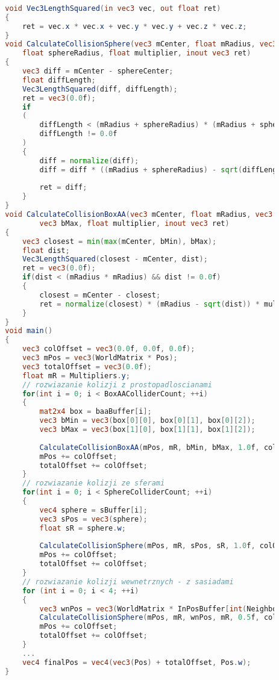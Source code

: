 		\begin{lstlisting}[language=GLSL]
		
		void Vec3LengthSquared(in vec3 vec, out float ret)
		{
			ret = vec.x * vec.x + vec.y * vec.y + vec.z * vec.z;
		}
		void CalculateCollisionSphere(vec3 mCenter, float mRadius, vec3 sphereCenter, 
			float sphereRadius, float multiplier, inout vec3 ret)
		{
			vec3 diff = mCenter - sphereCenter;
			float diffLength;
			Vec3LengthSquared(diff, diffLength);
			ret = vec3(0.0f);
			if
			(
				diffLength < (mRadius + sphereRadius) * (mRadius + sphereRadius) &&
				diffLength != 0.0f
			)
			{
				diff = normalize(diff);
				diff = diff * ((mRadius + sphereRadius) - sqrt(diffLength)) * multiplier;
				
				ret = diff;
			}
		}
		void CalculateCollisionBoxAA(vec3 mCenter, float mRadius, vec3 bMin, 
				vec3 bMax, float multiplier, inout vec3 ret)
		{
			vec3 closest = min(max(mCenter, bMin), bMax);
			float dist;
			Vec3LengthSquared(closest - mCenter, dist);
			ret = vec3(0.0f);
			if(dist < (mRadius * mRadius) && dist != 0.0f)
			{
				closest = mCenter - closest;
				ret = normalize(closest) * (mRadius - sqrt(dist)) * multiplier;
			}
		}
		void main()
		{
			vec3 colOffset = vec3(0.0f, 0.0f, 0.0f);
			vec3 mPos = vec3(WorldMatrix * Pos);
			vec3 totalOffset = vec3(0.0f);
			float mR = Multipliers.y;
			// rozwiazanie kolizji z prostopadloscianami
			for(int i = 0; i < BoxAAColliderCount; ++i)
			{
				mat2x4 box = baaBuffer[i];
				vec3 bMin = vec3(box[0][0], box[0][1], box[0][2]);
				vec3 bMax = vec3(box[1][0], box[1][1], box[1][2]);
				
				CalculateCollisionBoxAA(mPos, mR, bMin, bMax, 1.0f, colOffset);
				mPos += colOffset;
				totalOffset += colOffset;
			}
			// rozwiazanie kolizji ze sferami
			for(int i = 0; i < SphereColliderCount; ++i)
			{
				vec4 sphere = sBuffer[i];
				vec3 sPos = vec3(sphere);
				float sR = sphere.w;
				
				CalculateCollisionSphere(mPos, mR, sPos, sR, 1.0f, colOffset);
				mPos += colOffset;
				totalOffset += colOffset;
			}
			// rozwiazanie kolizji wewnetrznych - z sasiadami
			for (int i = 0; i < 4; ++i)
			{
				vec3 wnPos = vec3(WorldMatrix * InPosBuffer[int(Neighbours[i])]);
				CalculateCollisionSphere(mPos, mR, wnPos, mR, 0.5f, colOffset);
				mPos += colOffset;
				totalOffset += colOffset;
			}
			...
			vec4 finalPos = vec4(vec3(Pos) + totalOffset, Pos.w);
		}
		
		\end{lstlisting}
			
